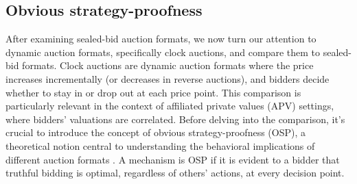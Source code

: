 \documentclass{article} %
\begin{document}









\subsection{Obvious strategy-proofness}\label{session:OSP}

After examining sealed-bid auction formats, we now turn our attention to dynamic auction formats, specifically clock auctions, and compare them to sealed-bid formats. Clock auctions are dynamic auction formats where the price increases incrementally (or decreases in reverse auctions), and bidders decide whether to stay in or drop out at each price point.
This comparison is particularly relevant in the context of affiliated private values (APV) settings, where bidders' valuations are correlated.
Before delving into the comparison, it's crucial to introduce the concept of obvious strategy-proofness (OSP), a theoretical notion central to understanding the behavioral implications of different auction formats \cite{li2017obviously}. 
A mechanism is OSP if it is evident to a bidder that truthful bidding is optimal, regardless of others' actions, at every decision point.
\end{document}
